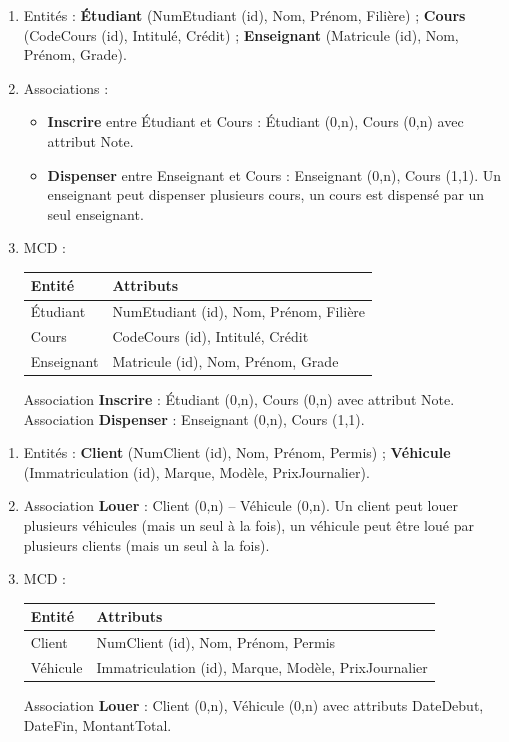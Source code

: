 \begin{enumerate}
    \item Entités : \textbf{Étudiant} (NumEtudiant (id), Nom, Prénom, Filière) ; \textbf{Cours} (CodeCours (id), Intitulé, Crédit) ; \textbf{Enseignant} (Matricule (id), Nom, Prénom, Grade).
    \item Associations :
    \begin{itemize}
        \item \textbf{Inscrire} entre Étudiant et Cours : Étudiant (0,n), Cours (0,n) avec attribut Note.
        \item \textbf{Dispenser} entre Enseignant et Cours : Enseignant (0,n), Cours (1,1). Un enseignant peut dispenser plusieurs cours, un cours est dispensé par un seul enseignant.
    \end{itemize}
    \item MCD :
    \begin{center}
    \begin{tabular}{|l|l|}
    \hline
    \textbf{Entité} & \textbf{Attributs} \\
    \hline
    Étudiant & NumEtudiant (id), Nom, Prénom, Filière \\
    \hline
    Cours & CodeCours (id), Intitulé, Crédit \\
    \hline
    Enseignant & Matricule (id), Nom, Prénom, Grade \\
    \hline
    \end{tabular}
    \end{center}
    Association \textbf{Inscrire} : Étudiant (0,n), Cours (0,n) avec attribut Note.
    Association \textbf{Dispenser} : Enseignant (0,n), Cours (1,1).
\end{enumerate}

\begin{enumerate}
    \item Entités : \textbf{Client} (NumClient (id), Nom, Prénom, Permis) ; \textbf{Véhicule} (Immatriculation (id), Marque, Modèle, PrixJournalier).
    \item Association \textbf{Louer} : Client (0,n) -- Véhicule (0,n). Un client peut louer plusieurs véhicules (mais un seul à la fois), un véhicule peut être loué par plusieurs clients (mais un seul à la fois).
    \item MCD :
    \begin{center}
    \begin{tabular}{|l|l|}
    \hline
    \textbf{Entité} & \textbf{Attributs} \\
    \hline
    Client & NumClient (id), Nom, Prénom, Permis \\
    \hline
    Véhicule & Immatriculation (id), Marque, Modèle, PrixJournalier \\
    \hline
    \end{tabular}
    \end{center}
    Association \textbf{Louer} : Client (0,n), Véhicule (0,n) avec attributs DateDebut, DateFin, MontantTotal.
\end{enumerate}

